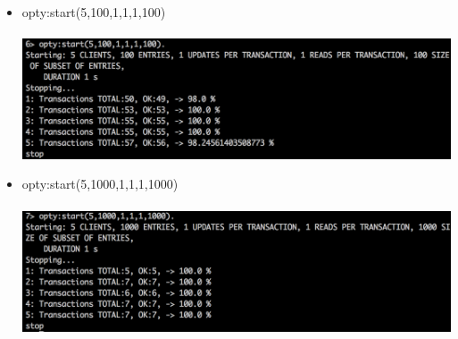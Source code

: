 \documentclass[a4paper, 11pt]{article}
\begin{document}
\begin{itemize}
\item opty:start(5,100,1,1,1,100)\\\\
\includegraphics[scale=0.5]{images/exp-ii-5.png} \\
\item opty:start(5,1000,1,1,1,1000)\\\\
\includegraphics[scale=0.5]{images/exp-ii-6.png} \\
\end{itemize}
\end{document}
